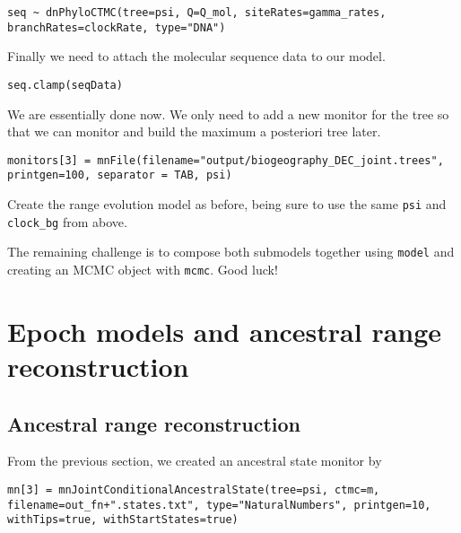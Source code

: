 {\tt \begin{snugshade*}
\begin{lstlisting}
seq ~ dnPhyloCTMC(tree=psi, Q=Q_mol, siteRates=gamma_rates, branchRates=clockRate, type="DNA")
\end{lstlisting}
\end{snugshade*}}
Finally we need to attach the molecular sequence data to our model.
{\tt \begin{snugshade*}
\begin{lstlisting}
seq.clamp(seqData)
\end{lstlisting}
\end{snugshade*}}

We are essentially done now. We  only need to add a new monitor for the tree so that we can monitor and build the maximum a posteriori tree later.
{\tt \small \begin{snugshade*}
\begin{lstlisting}
monitors[3] = mnFile(filename="output/biogeography_DEC_joint.trees", printgen=100, separator = TAB, psi)
\end{lstlisting}
\end{snugshade*}}

Create the range evolution model as before, being sure to use the same {\tt psi} and {\tt clock\_bg} from above.

The remaining challenge is to compose both submodels together using {\tt model} and creating an MCMC object with {\tt mcmc}. Good luck!

\newpage


\section{Epoch models and ancestral range reconstruction}

\subsection{Ancestral range reconstruction}


From the previous section, we created an ancestral state monitor by
\begin{snugshade}
\begin{lstlisting}
mn[3] = mnJointConditionalAncestralState(tree=psi, ctmc=m, filename=out_fn+".states.txt", type="NaturalNumbers", printgen=10, withTips=true, withStartStates=true)
\end{lstlisting}
\end{snugshade}


